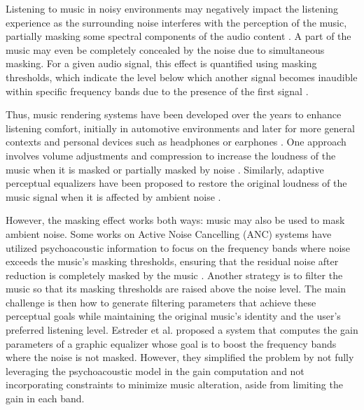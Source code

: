 Listening to music %
in noisy environments may negatively impact the listening experience as the surrounding noise interferes with the perception of the music, partially masking some spectral components of the audio content \cite{mooreModelPredictionThresholds1997, ramoPerceptualFrequencyResponse2012}. A part of the music may even be completely concealed by the noise due to simultaneous masking. For a given audio signal, this effect is quantified using masking thresholds, which indicate the level below which another signal becomes inaudible within specific frequency bands due to the presence of the first signal \cite{painterPerceptualCodingDigital2000, zwickerPsychoacousticsFactsModels2010}.

Thus, music rendering systems have been developed over the years to enhance listening comfort, initially in automotive environments \cite{clarkCompensationRoadNoise1987,millerCopingRoadNoise1994,christophNoiseDependentEqualization2012d} and later for more general contexts and personal devices such as headphones or earphones \cite{ramoPerceptualHeadphoneEqualization2013, jrAdaptedAudioMasking2015,jrCollaborativelyProcessingAudio2016}.  One approach involves volume adjustments and compression to increase the loudness of the music when it is masked or partially masked by noise \cite{clarkCompensationRoadNoise1987, millerCopingRoadNoise1994, jrAdaptedAudioMasking2015, kuivalainenAdaptiveModulationAudio2021}.  Similarly, adaptive perceptual equalizers have been proposed to restore the original loudness of the music signal when it is affected by ambient noise \cite{christophNoiseDependentEqualization2012d, ramoPerceptualHeadphoneEqualization2013}.

However, the masking effect works both ways: music may also be used to mask ambient noise. Some works on Active Noise Cancelling (ANC) systems have utilized psychoacoustic information to focus on the frequency bands where noise exceeds the music's masking thresholds, ensuring that the residual noise after reduction is completely masked by the music \cite{docloActiveNoiseReduction2016, belyiIntegratedPsychoacousticActive2019, zachosFeedforwardHeadphoneActive2024}. Another strategy is to filter the music so that its masking thresholds are raised above the noise level. The main challenge is then how to generate filtering parameters that achieve these perceptual goals while maintaining the original music's identity and the user’s preferred listening level. Estreder et al. \cite{estrederPerceptualAudioEqualization2018} proposed a system that computes the gain parameters of a graphic equalizer whose goal is to boost the frequency bands where the noise is not masked. However, they simplified the problem by not fully leveraging the psychoacoustic model in the gain computation and not incorporating constraints to minimize music alteration, aside from limiting the gain in each band.

